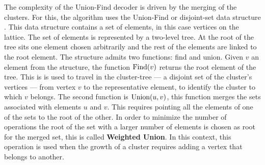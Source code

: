 The complexity of the Union-Find decoder is driven by the merging of the clusters. For this, the algorithm uses the Union-Find or disjoint-set data structure \cite{tarjan1975efficiency}. This data structure contains a set of elements, in this case vertices on the lattice. The set of elements is represented by a two-level tree. At the root of the tree sits one element chosen arbitrarily and the rest of the elements are linked to the root element. The structure admits two functions: find and union. Given $v$ an element from the structure, the function $\operatorname{Find}(v)$ returns the root element of the tree. This is is used to travel in the cluster-tree --- a disjoint set of the cluster's vertices --- from vertex $v$ to the representative element, to identify the cluster to which $v$ belongs. The second function is $\operatorname{Union}(u, v)$, this function merges the sets associated with elements $u$ and $v$. This requires pointing all the elements of one of the sets to the root of the other. In order to minimize the number of operations the root of the set with a larger number of elements is chosen as root for the merged set, this is called \textbf{Weighted Union}. In this context, this operation is used when the growth of a cluster requires adding a vertex that belongs to another. %